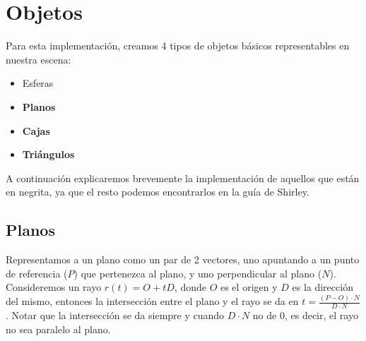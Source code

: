 \section{Objetos} \label{sec:objetos}

Para esta implementación, creamos 4 tipos de objetos básicos representables en nuestra escena:

\begin{itemize}
    \item Esferas
    \item \textbf{Planos}
    \item \textbf{Cajas}
    \item \textbf{Triángulos}
\end{itemize}

A continuación explicaremos brevemente la implementación de aquellos que están en negrita, ya que
el resto podemos encontrarlos en la guía de Shirley.

\subsection{Planos}\label{subsec:planos}

Representamos a un plano como un par de 2 vectores, uno apuntando a un punto de referencia ($P$) que
pertenezca al plano, y uno perpendicular al plano ($N$).
Consideremos un rayo $r(t) = O + t D$, donde $O$ es el origen y $D$ es la dirección del mismo,
entonces la intersección entre el plano y el rayo se da en $t = \frac{(P - O) \cdot N}{D \cdot N}$.
Notar que la intersección se da siempre y cuando $D \cdot N$ no de 0, es decir, el rayo no sea
paralelo al plano.

